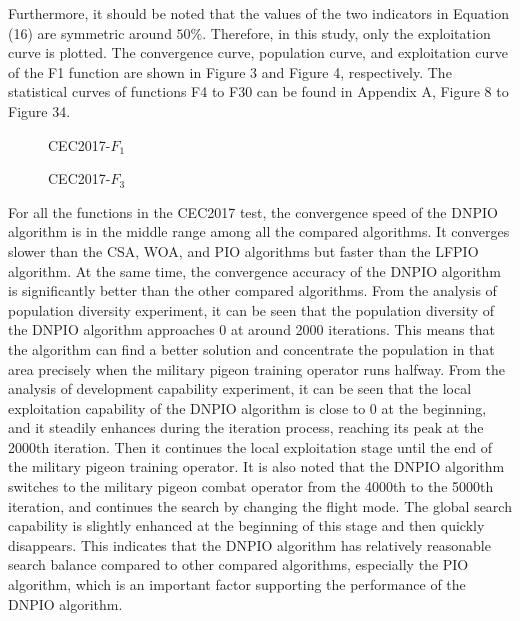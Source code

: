 \documentclass[preprint,review,compress,12pt]{elsarticle}
\begin{document}
Furthermore, it should be noted that the values of the two indicators in Equation (16) are symmetric around $50\%$. Therefore, in this study, only the exploitation curve is plotted. The convergence curve, population curve, and exploitation curve of the F1 function are shown in Figure 3 and Figure 4, respectively. The statistical curves of functions F4 to F30 can be found in Appendix A, Figure 8 to Figure 34.
\begin{figure}[H]
\centering
{}
\quad
{}
\quad
{}
\caption{CEC2017-$F_1$}
\end{figure}

\begin{figure}[H]
\centering
{}
\quad
{}
\quad
{}
\caption{CEC2017-$F_3$}
\end{figure}

For all the functions in the CEC2017 test, the convergence speed of the DNPIO algorithm is in the middle range among all the compared algorithms. It converges slower than the CSA, WOA, and PIO algorithms but faster than the LFPIO algorithm. At the same time, the convergence accuracy of the DNPIO algorithm is significantly better than the other compared algorithms. From the analysis of population diversity experiment, it can be seen that the population diversity of the DNPIO algorithm approaches 0 at around 2000 iterations. This means that the algorithm can find a better solution and concentrate the population in that area precisely when the military pigeon training operator runs halfway. From the analysis of development capability experiment, it can be seen that the local exploitation capability of the DNPIO algorithm is close to 0 at the beginning, and it steadily enhances during the iteration process, reaching its peak at the 2000th iteration. Then it continues the local exploitation stage until the end of the military pigeon training operator. It is also noted that the DNPIO algorithm switches to the military pigeon combat operator from the 4000th to the 5000th iteration, and continues the search by changing the flight mode. The global search capability is slightly enhanced at the beginning of this stage and then quickly disappears. This indicates that the DNPIO algorithm has relatively reasonable search balance compared to other compared algorithms, especially the PIO algorithm, which is an important factor supporting the performance of the DNPIO algorithm.
\end{document}
